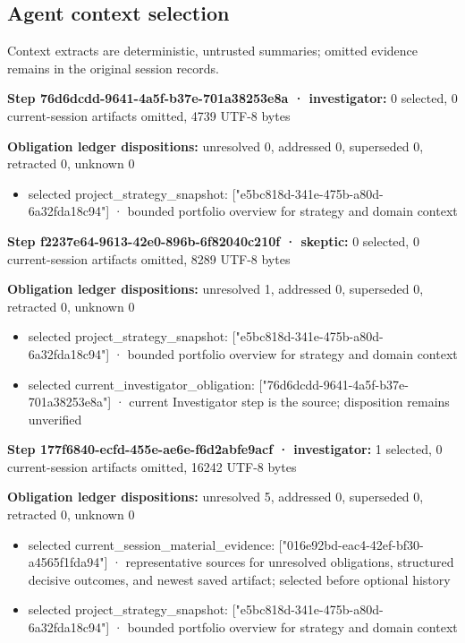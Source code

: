 \documentclass[11pt]{article}
\begin{document}
\subsection{Agent context selection}
Context extracts are deterministic, untrusted summaries; omitted evidence remains in the original session records.\par
\textbf{Step 76d6dcdd-9641-4a5f-b37e-701a38253e8a · investigator:} 0 selected, 0 current-session artifacts omitted, 4739 UTF-8 bytes\par
\textbf{Obligation ledger dispositions:} unresolved 0, addressed 0, superseded 0, retracted 0, unknown 0\par
\begin{itemize}
\item selected project\_strategy\_snapshot: ["e5bc818d-341e-475b-a80d-6a32fda18c94"] · bounded portfolio overview for strategy and domain context
\end{itemize}
\textbf{Step f2237e64-9613-42e0-896b-6f82040c210f · skeptic:} 0 selected, 0 current-session artifacts omitted, 8289 UTF-8 bytes\par
\textbf{Obligation ledger dispositions:} unresolved 1, addressed 0, superseded 0, retracted 0, unknown 0\par
\begin{itemize}
\item selected project\_strategy\_snapshot: ["e5bc818d-341e-475b-a80d-6a32fda18c94"] · bounded portfolio overview for strategy and domain context
\item selected current\_investigator\_obligation: ["76d6dcdd-9641-4a5f-b37e-701a38253e8a"] · current Investigator step is the source; disposition remains unverified
\end{itemize}
\textbf{Step 177f6840-ecfd-455e-ae6e-f6d2abfe9acf · investigator:} 1 selected, 0 current-session artifacts omitted, 16242 UTF-8 bytes\par
\textbf{Obligation ledger dispositions:} unresolved 5, addressed 0, superseded 0, retracted 0, unknown 0\par
\begin{itemize}
\item selected current\_session\_material\_evidence: ["016e92bd-eac4-42ef-bf30-a4565f1fda94"] · representative sources for unresolved obligations, structured decisive outcomes, and newest saved artifact; selected before optional history
\item selected project\_strategy\_snapshot: ["e5bc818d-341e-475b-a80d-6a32fda18c94"] · bounded portfolio overview for strategy and domain context
\end{itemize}
\end{document}

